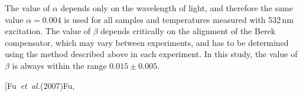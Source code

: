 \documentclass[reprint,aps,pra,superscriptaddress,amsmath,amssymb,linenumbers,longbibliography]{revtex4-1}
\begin{document}
The value of $\alpha$ depends only on the wavelength of light, and therefore the same value $\alpha=0.004$ is used for all samples and temperatures measured with 532\,nm excitation. 
The value of $\beta$ depends critically on the alignment of the Berek compensator, which may vary between experiments, and has to be determined using the method described above in each experiment. 
In this study, the value of $\beta$ is always within the range $0.015\pm 0.005$.
%
%
\begin{thebibliography}{79}%
	\makeatletter
	\providecommand \@ifxundefined [1]{%
		\@ifx{#1\undefined}
	}%
	\providecommand \@ifnum [1]{%
		\ifnum #1\expandafter \@firstoftwo
		\else \expandafter \@secondoftwo
		\fi
	}%
	\providecommand \@ifx [1]{%
		\ifx #1\expandafter \@firstoftwo
		\else \expandafter \@secondoftwo
		\fi
	}%
	\providecommand \natexlab [1]{#1}%
	\providecommand \enquote  [1]{``#1''}%
	\providecommand \bibnamefont  [1]{#1}%
	\providecommand \bibfnamefont [1]{#1}%
	\providecommand \citenamefont [1]{#1}%
	\providecommand \href@noop [0]{\@secondoftwo}%
	\providecommand \href [0]{\begingroup \@sanitize@url \@href}%
	\providecommand \@href[1]{\@@startlink{#1}\@@href}%
	\providecommand \@@href[1]{\endgroup#1\@@endlink}%
	\providecommand \@sanitize@url [0]{\catcode `\\12\catcode `\$12\catcode
		`\&12\catcode `\#12\catcode `\^12\catcode `\_12\catcode `\%12\relax}%
	\providecommand \@@startlink[1]{}%
	\providecommand \@@endlink[0]{}%
	\providecommand \url  [0]{\begingroup\@sanitize@url \@url }%
	\providecommand \@url [1]{\endgroup\@href {#1}{\urlprefix }}%
	\providecommand \urlprefix  [0]{URL }%
	\providecommand \Eprint [0]{\href }%
	\providecommand \doibase [0]{http://dx.doi.org/}%
	\providecommand \selectlanguage [0]{\@gobble}%
	\providecommand \bibinfo  [0]{\@secondoftwo}%
	\providecommand \bibfield  [0]{\@secondoftwo}%
	\providecommand \translation [1]{[#1]}%
	\providecommand \BibitemOpen [0]{}%
	\providecommand \bibitemStop [0]{}%
	\providecommand \bibitemNoStop [0]{.\EOS\space}%
	\providecommand \EOS [0]{\spacefactor3000\relax}%
	\providecommand \BibitemShut  [1]{\csname bibitem#1\endcsname}%
	\let\auto@bib@innerbib\@empty
	\bibitem [{\citenamefont {Fu}\ \emph {et~al.}(2007)\citenamefont {Fu},
}
\end{thebibliography}
\end{document}
